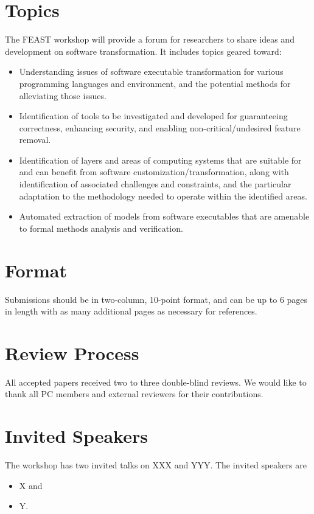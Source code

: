 \documentclass[sigconf]{acmart}
\begin{document}
\section{Topics}
The FEAST workshop will provide a forum for researchers to share
ideas and development on software transformation.
It includes topics geared toward:
\begin{itemize}

\item Understanding issues of software executable transformation for
  various programming languages and environment, and the potential
  methods for alleviating those issues.

\item Identification of tools to be investigated and developed for
  guaranteeing correctness, enhancing security, and enabling
  non-critical/undesired feature removal.

\item Identification of layers and areas of computing systems that are
  suitable for and can benefit from software
  customization/transformation, along with identification of
  associated challenges and constraints, and the particular adaptation
  to the methodology needed to operate within the identified areas.

\item Automated extraction of models from software executables that
  are amenable to formal methods analysis and verification.

\end{itemize}

\section{Format}
Submissions should be in two-column, 10-point
format, and can be up to 6 pages in length with as
many additional pages as necessary for references.

\section{Review Process}
All accepted papers received two to three double-blind reviews.
We would like to thank all PC members and external reviewers for
their contributions.

\section{Invited Speakers}
The workshop has two invited talks on XXX and YYY.
The invited speakers are
\begin{itemize}
\item X and
\item Y.
\end{itemize}
\end{document}
